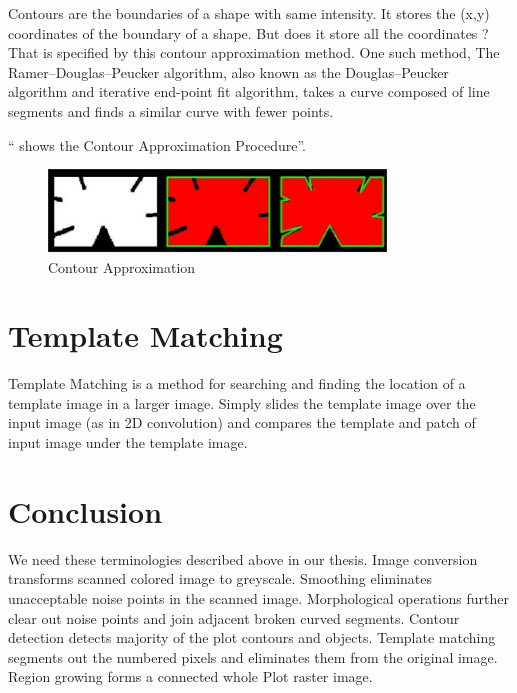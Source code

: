 Contours are the boundaries of a shape with same intensity. It stores the (x,y) coordinates of the boundary of a shape. But does it store all the coordinates ? That is specified by this contour approximation method. One such method, The Ramer–Douglas–Peucker algorithm, also known as the Douglas–Peucker algorithm and iterative end-point fit algorithm, takes a curve composed of line segments and finds a similar curve with fewer points.

`` shows the Contour Approximation Procedure''.

\begin{figure}[h]
  \centering
  \includegraphics[width=0.8\textwidth]{figures/conapp.png}
  \caption{Contour Approximation}
  \label{fig:conapp}
\end{figure}

\section{Template Matching}
Template Matching is a method for searching and finding the location of a template image in a larger image. Simply slides the template image over the input image (as in 2D convolution) and compares the template and patch of input image under the template image.

\section{Conclusion}
We need these terminologies described above in our thesis. Image conversion transforms scanned colored image to greyscale. Smoothing eliminates unacceptable noise points in the scanned image. Morphological operations further clear out noise points and join adjacent broken curved segments. Contour detection detects majority of the plot contours and objects. Template matching segments out the numbered pixels and eliminates them from the original image. Region growing forms a connected whole Plot raster image.

\endinput



